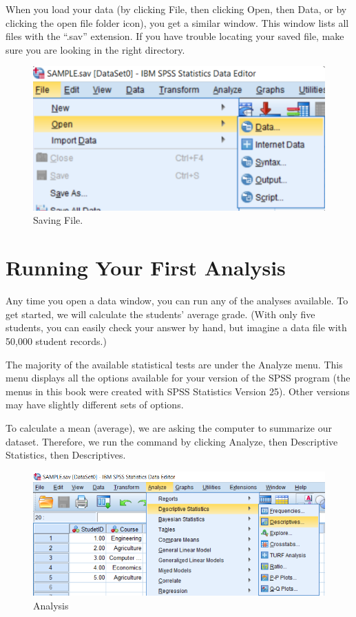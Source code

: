 \documentclass[
]{book}
\begin{document}
When you load your data (by clicking File, then clicking Open, then Data, or by clicking the open file folder icon), you get a similar window. This window lists all files with the ``.sav'' extension. If you have trouble locating your saved file, make sure you are looking in the right directory.

\begin{figure}
\centering
\includegraphics{Opendata.png}
\caption{Saving File.}
\end{figure}

\hypertarget{running-your-first-analysis}{%
\section{Running Your First Analysis}\label{running-your-first-analysis}}

Any time you open a data window, you can run any of the analyses available. To get started, we will calculate the students' average grade. (With only five students, you can easily check your answer by hand, but imagine a data file with 50,000 student records.)

The majority of the available statistical tests are under the Analyze menu. This menu displays all the options available for your version of the SPSS program (the menus in this book were created with SPSS Statistics Version 25). Other versions may have slightly different sets of options.

To calculate a mean (average), we are asking the computer to summarize our dataset. Therefore, we run the command by clicking Analyze, then Descriptive Statistics, then Descriptives.

\begin{figure}
\centering
\includegraphics{analyze1.png}
\caption{Analysis}
\end{figure}
\end{document}
